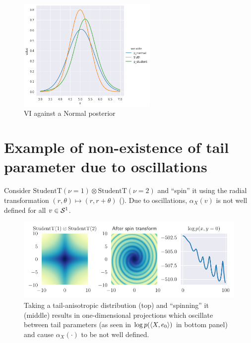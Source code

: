 \documentclass[twoside]{article}
\theoremstyle{definition}
\theoremstyle{remark}
\begin{document}
{\begin{figure}[H]
  \centering
  \includegraphics[width=0.6\textwidth]{../Figures/normal_normal_posterior.png}
  \caption{VI against a Normal posterior}
  \label{fig:normal_normal}
\end{figure}

\section{Example of non-existence of tail parameter due to oscillations}
\label{eg:spiral}

Consider $\text{StudentT}(\nu=1) \otimes \text{StudentT}(\nu=2)$ and ``spin'' it
using the radial transformation $(r,\theta) \mapsto (r,r+\theta)$ (). Due to
oscillations, $\alpha_X(v)$ is not well defined for all $v \in \mathcal{S}^{1}$.


\begin{figure}[htbp]
    \centering
    \includegraphics[scale=0.8]{Figures/spiral.pdf}
    \caption{Taking a tail-anisotropic distribution (top) and ``spinning'' it (middle) results in
        one-dimensional projections which oscillate between tail parameters (as seen in
        $\log p(\braket{X,e_0})$ in bottom panel) and cause $\alpha_X(\cdot)$ to be not well defined.
    }
    \label{fig:spiral}
\end{figure}

}
\end{document}

